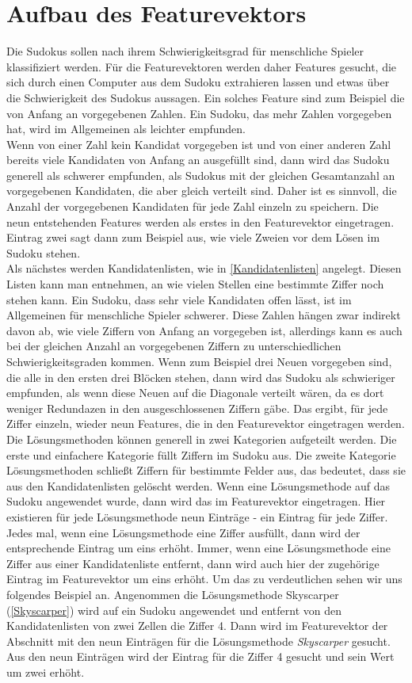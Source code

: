 \section{Aufbau des Featurevektors}
\label{Aufbau}
Die Sudokus sollen nach ihrem Schwierigkeitsgrad für menschliche Spieler klassifiziert werden. Für die Featurevektoren werden daher Features gesucht, die sich durch einen Computer aus dem Sudoku extrahieren lassen und etwas über die Schwierigkeit des Sudokus aussagen. Ein solches Feature sind zum Beispiel die von Anfang an vorgegebenen Zahlen. Ein Sudoku, das mehr Zahlen vorgegeben hat, wird im Allgemeinen als leichter empfunden.\\
Wenn von einer Zahl kein Kandidat vorgegeben ist und von einer anderen Zahl bereits viele Kandidaten von Anfang an ausgefüllt sind, dann wird das Sudoku generell als schwerer empfunden, als Sudokus mit der gleichen Gesamtanzahl an vorgegebenen Kandidaten, die aber gleich verteilt sind. Daher ist es sinnvoll, die Anzahl der vorgegebenen Kandidaten für jede Zahl einzeln zu speichern. Die neun entstehenden Features werden als erstes in den Featurevektor eingetragen. Eintrag zwei sagt dann zum Beispiel aus, wie viele Zweien vor dem Lösen im Sudoku stehen.\\
Als nächstes werden Kandidatenlisten, wie in \ref{Kandidatenlisten} angelegt. Diesen Listen kann man entnehmen, an wie vielen Stellen eine bestimmte Ziffer noch stehen kann. Ein Sudoku, dass sehr viele Kandidaten offen lässt, ist im Allgemeinen für menschliche Spieler schwerer. Diese Zahlen hängen zwar indirekt davon ab, wie viele Ziffern von Anfang an vorgegeben ist, allerdings kann es auch bei der gleichen Anzahl an vorgegebenen Ziffern zu unterschiedlichen Schwierigkeitsgraden kommen. Wenn zum Beispiel drei Neuen vorgegeben sind, die alle in den ersten drei Blöcken stehen, dann wird das Sudoku als schwieriger empfunden, als wenn diese Neuen auf die Diagonale verteilt wären, da es dort weniger Redundazen in den ausgeschlossenen Ziffern gäbe. Das ergibt, für jede Ziffer einzeln, wieder neun Features, die in den Featurevektor eingetragen werden.\\
Die Lösungsmethoden können generell in zwei Kategorien aufgeteilt werden. Die erste und einfachere Kategorie füllt Ziffern im Sudoku aus. Die zweite Kategorie Lösungsmethoden schließt Ziffern für bestimmte Felder aus, das bedeutet, dass sie aus den Kandidatenlisten gelöscht werden. Wenn eine Lösungsmethode auf das Sudoku angewendet wurde, dann wird das im Featurevektor eingetragen. Hier existieren für jede Lösungsmethode neun Einträge - ein Eintrag für jede Ziffer. Jedes mal, wenn eine Lösungsmethode eine Ziffer ausfüllt, dann wird der entsprechende Eintrag um eins erhöht. Immer, wenn eine Lösungsmethode eine Ziffer aus einer Kandidatenliste entfernt, dann wird auch hier der zugehörige Eintrag im Featurevektor um eins erhöht. Um das zu verdeutlichen sehen wir uns folgendes Beispiel an. Angenommen die Lösungsmethode Skyscarper (\ref{Skyscarper}) wird auf ein Sudoku angewendet und entfernt von den Kandidatenlisten von zwei Zellen die Ziffer 4. Dann wird im Featurevektor der Abschnitt mit den neun Einträgen für die Lösungsmethode \textit{Skyscarper} gesucht. Aus den neun Einträgen wird der Eintrag für die Ziffer 4 gesucht und sein Wert um zwei erhöht.\\
